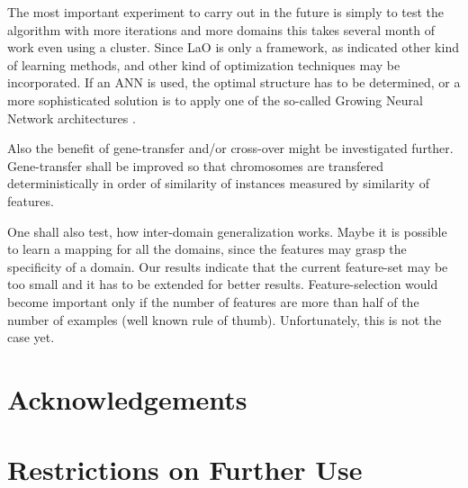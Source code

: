 \documentclass{acm_proc_article-sp}
\begin{document}
The most important experiment to carry out in the future is simply to test the algorithm with more iterations and more domains this takes several month of work even using a cluster. Since LaO is only a framework, as indicated other kind of learning methods, and other kind of optimization techniques may be incorporated. If an ANN is used, the optimal structure has to be determined, or a more sophisticated solution is to apply one of the so-called Growing Neural Network architectures \cite{Qiang}.

Also the benefit of gene-transfer and/or cross-over might be investigated further. Gene-transfer shall be improved so that chromosomes are transfered deterministically in order of similarity of instances measured by similarity of features.

One shall also test, how inter-domain generalization works. Maybe it is possible to learn a mapping for all the domains, since the features may grasp the specificity of a domain. Our results indicate that the current feature-set may be too small and it has to be extended for better results. Feature-selection would become important only if the number of features are more than half of the number of examples (well known rule of thumb). Unfortunately, this is not the case yet.


\section{Acknowledgements}

\section{Restrictions on Further Use}



\end{document}
